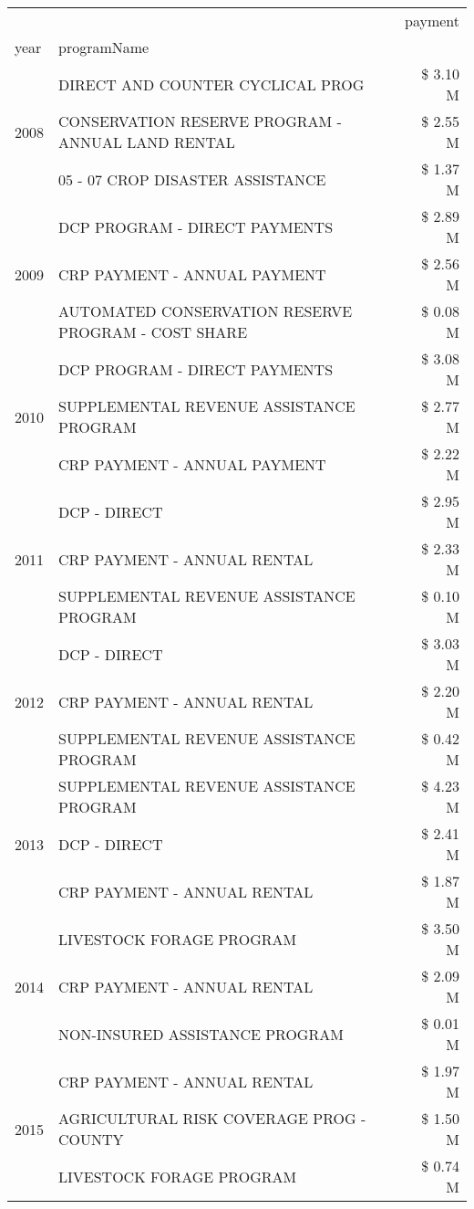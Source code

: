 \begin{tabular}{llr}
\toprule
 &  & payment \\
year & programName &  \\
\midrule
\multirow[t]{3}{*}{2008} & DIRECT AND COUNTER CYCLICAL PROG & \$ 3.10 M \\
 & CONSERVATION RESERVE PROGRAM - ANNUAL LAND RENTAL & \$ 2.55 M \\
 & 05 - 07 CROP DISASTER ASSISTANCE & \$ 1.37 M \\
\cline{1-3}
\multirow[t]{3}{*}{2009} & DCP PROGRAM - DIRECT PAYMENTS & \$ 2.89 M \\
 & CRP PAYMENT - ANNUAL PAYMENT & \$ 2.56 M \\
 & AUTOMATED CONSERVATION RESERVE PROGRAM - COST SHARE & \$ 0.08 M \\
\cline{1-3}
\multirow[t]{3}{*}{2010} & DCP PROGRAM - DIRECT PAYMENTS & \$ 3.08 M \\
 & SUPPLEMENTAL REVENUE ASSISTANCE PROGRAM & \$ 2.77 M \\
 & CRP PAYMENT - ANNUAL PAYMENT & \$ 2.22 M \\
\cline{1-3}
\multirow[t]{3}{*}{2011} & DCP - DIRECT & \$ 2.95 M \\
 & CRP PAYMENT - ANNUAL RENTAL & \$ 2.33 M \\
 & SUPPLEMENTAL REVENUE ASSISTANCE PROGRAM & \$ 0.10 M \\
\cline{1-3}
\multirow[t]{3}{*}{2012} & DCP - DIRECT & \$ 3.03 M \\
 & CRP PAYMENT - ANNUAL RENTAL & \$ 2.20 M \\
 & SUPPLEMENTAL REVENUE ASSISTANCE PROGRAM & \$ 0.42 M \\
\cline{1-3}
\multirow[t]{3}{*}{2013} & SUPPLEMENTAL REVENUE ASSISTANCE PROGRAM & \$ 4.23 M \\
 & DCP - DIRECT & \$ 2.41 M \\
 & CRP PAYMENT - ANNUAL RENTAL & \$ 1.87 M \\
\cline{1-3}
\multirow[t]{3}{*}{2014} & LIVESTOCK FORAGE PROGRAM & \$ 3.50 M \\
 & CRP PAYMENT - ANNUAL RENTAL & \$ 2.09 M \\
 & NON-INSURED ASSISTANCE PROGRAM & \$ 0.01 M \\
\cline{1-3}
\multirow[t]{3}{*}{2015} & CRP PAYMENT - ANNUAL RENTAL & \$ 1.97 M \\
 & AGRICULTURAL RISK COVERAGE PROG - COUNTY & \$ 1.50 M \\
 & LIVESTOCK FORAGE PROGRAM & \$ 0.74 M \\

\end{tabular}
